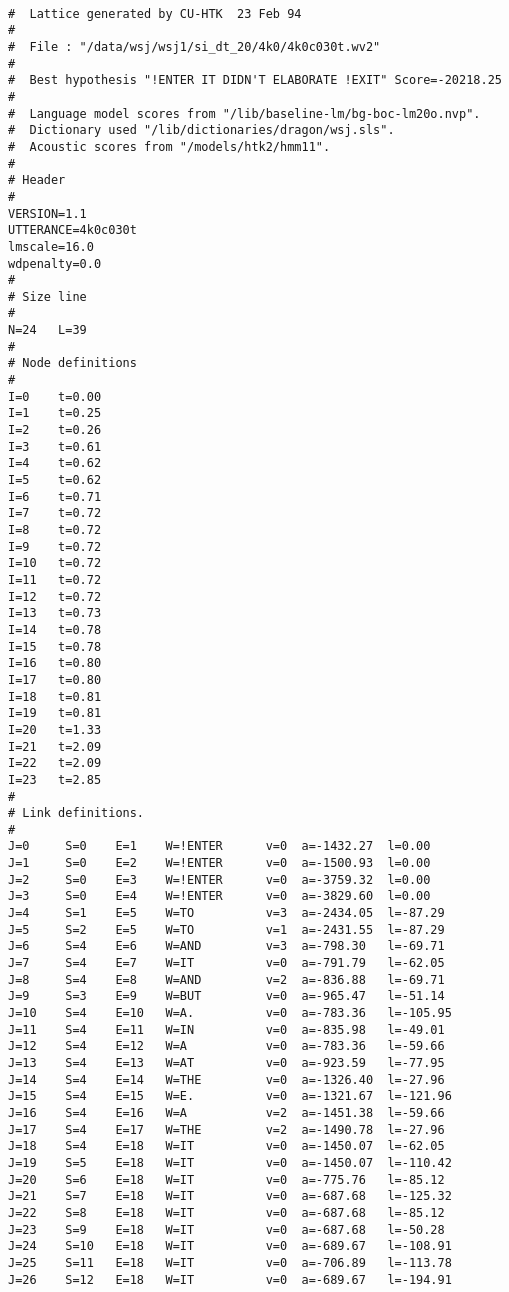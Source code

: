 \begin{verbatim}

#  Lattice generated by CU-HTK  23 Feb 94
#
#  File : "/data/wsj/wsj1/si_dt_20/4k0/4k0c030t.wv2"
#
#  Best hypothesis "!ENTER IT DIDN'T ELABORATE !EXIT" Score=-20218.25
#  
#  Language model scores from "/lib/baseline-lm/bg-boc-lm20o.nvp".
#  Dictionary used "/lib/dictionaries/dragon/wsj.sls".
#  Acoustic scores from "/models/htk2/hmm11".
#
# Header
#
VERSION=1.1
UTTERANCE=4k0c030t
lmscale=16.0
wdpenalty=0.0
#
# Size line
#
N=24   L=39   
#
# Node definitions
#
I=0    t=0.00 
I=1    t=0.25 
I=2    t=0.26 
I=3    t=0.61 
I=4    t=0.62 
I=5    t=0.62 
I=6    t=0.71 
I=7    t=0.72 
I=8    t=0.72 
I=9    t=0.72 
I=10   t=0.72 
I=11   t=0.72 
I=12   t=0.72 
I=13   t=0.73 
I=14   t=0.78 
I=15   t=0.78 
I=16   t=0.80 
I=17   t=0.80 
I=18   t=0.81 
I=19   t=0.81 
I=20   t=1.33 
I=21   t=2.09 
I=22   t=2.09 
I=23   t=2.85 
#
# Link definitions.
#
J=0     S=0    E=1    W=!ENTER      v=0  a=-1432.27  l=0.00   
J=1     S=0    E=2    W=!ENTER      v=0  a=-1500.93  l=0.00   
J=2     S=0    E=3    W=!ENTER      v=0  a=-3759.32  l=0.00   
J=3     S=0    E=4    W=!ENTER      v=0  a=-3829.60  l=0.00   
J=4     S=1    E=5    W=TO          v=3  a=-2434.05  l=-87.29 
J=5     S=2    E=5    W=TO          v=1  a=-2431.55  l=-87.29 
J=6     S=4    E=6    W=AND         v=3  a=-798.30   l=-69.71 
J=7     S=4    E=7    W=IT          v=0  a=-791.79   l=-62.05 
J=8     S=4    E=8    W=AND         v=2  a=-836.88   l=-69.71 
J=9     S=3    E=9    W=BUT         v=0  a=-965.47   l=-51.14 
J=10    S=4    E=10   W=A.          v=0  a=-783.36   l=-105.95
J=11    S=4    E=11   W=IN          v=0  a=-835.98   l=-49.01 
J=12    S=4    E=12   W=A           v=0  a=-783.36   l=-59.66 
J=13    S=4    E=13   W=AT          v=0  a=-923.59   l=-77.95 
J=14    S=4    E=14   W=THE         v=0  a=-1326.40  l=-27.96 
J=15    S=4    E=15   W=E.          v=0  a=-1321.67  l=-121.96
J=16    S=4    E=16   W=A           v=2  a=-1451.38  l=-59.66 
J=17    S=4    E=17   W=THE         v=2  a=-1490.78  l=-27.96 
J=18    S=4    E=18   W=IT          v=0  a=-1450.07  l=-62.05 
J=19    S=5    E=18   W=IT          v=0  a=-1450.07  l=-110.42
J=20    S=6    E=18   W=IT          v=0  a=-775.76   l=-85.12 
J=21    S=7    E=18   W=IT          v=0  a=-687.68   l=-125.32
J=22    S=8    E=18   W=IT          v=0  a=-687.68   l=-85.12 
J=23    S=9    E=18   W=IT          v=0  a=-687.68   l=-50.28 
J=24    S=10   E=18   W=IT          v=0  a=-689.67   l=-108.91
J=25    S=11   E=18   W=IT          v=0  a=-706.89   l=-113.78
J=26    S=12   E=18   W=IT          v=0  a=-689.67   l=-194.91

\end{verbatim}
